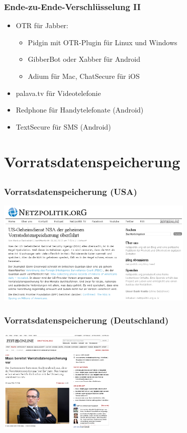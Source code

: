\documentclass[12pt]{beamer}
\begin{document}
\begin{frame}
  \frametitle{Ende-zu-Ende-Verschlüsselung II}
  \begin{itemize}
    \item<2-> OTR für Jabber:
      \begin{itemize}
        \item Pidgin mit OTR-Plugin für Linux und Windows
        \item GibberBot oder Xabber für Android
        \item Adium für Mac, ChatSecure für iOS
      \end{itemize}
    \item<3-> palava.tv für Videotelefonie
    \item<4-> Redphone für Handytelefonate (Android)
    \item<5-> TextSecure für SMS (Android)
  \end{itemize}
\end{frame}

\section{Vorratsdatenspeicherung}
\subsection{}

\begin{frame}
  \frametitle{Vorratsdatenspeicherung (USA)}
    \begin{center}
      \includegraphics[height=5cm]{img/netzpolitik-verizon.png}
    \end{center}
\end{frame}

\begin{frame}
  \frametitle{Vorratsdatenspeicherung (Deutschland)}
    \begin{center}
      \includegraphics[height=5cm]{img/zeit-vds.png}
    \end{center}
\end{frame}
\end{document}
